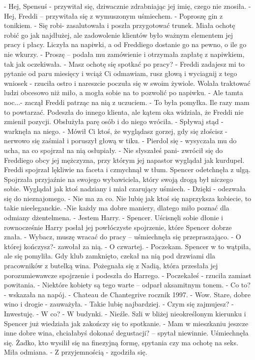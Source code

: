 \documentclass[12pt,a4paper]{book}
\begin{document}
- Hej, Spensuś - przywitał się, dziwacznie zdrabniając jej imię, czego nie znosiła. 
- Hej, Freddi – przywitała się z wymuszonym uśmiechem. 
- Poproszę gin z tonikiem.
- Się robi- zasalutowała i poszła przygotować trunek. 
Miała ochotę robić go jak najdłużej, ale zadowolenie klientów było ważnym elementem jej pracy i płacy. Liczyła na napiwki, a od Freddiego dostanie go na pewno, o ile go nie wkurzy. 
- Proszę – podała mu zamówienie i otrzymała zapłatę z napiwkiem, tak jak oczekiwała. 
- Masz ochotę się spotkać po pracy?
- Freddi zadajesz mi to pytanie od paru miesięcy i wciąż Ci odmawiam, rusz głową i wyciagnij z tego wniosek - rzuciła ostro i nareszcie poczuła się w swoim żywiole. 
Wolała traktować ludzi obcesowo niż miło, a mogła sobie na to pozwolić po napiwku.
- Ale tamta noc...- zaczął Freddi patrząc na nią z uczuciem. 
- To była pomyłka. Ile razy mam to powtarzać. 
Podeszła do innego klienta, ale kątem oka widziala, że Freddi nie zmienił pozycji. Obsłużyła parę osób i do niego wróciła.
- Spływaj stąd - warknęła na niego. 
- Mówił Ci ktoś, że wyglądasz gorzej, gdy się złościsz - nerwowo się zaśmiał i poruszył głową w tiku. 
- Pierdol się - wysyczała mu do ucha, na co spojrzał na nią osłupiały.
- Nie słyszałeś pani- zwrócił się do Freddiego obcy jej mężczyzna, przy którym jej napastor wyglądał jak kurdupel.
Freddi spojrzał lękliwie na faceta i czmychnął w tłum. 
Spencer odetchnęła z ulgą. Spojrzała przyjaźnie na swojego wybawiciela, który swoją drogą był niczego sobie. Wyglądał jak ktoś nadziany i miał czarujący uśmiech. 
- Dzięki - odezwała się do nieznajomego. 
- Nie ma za co. Nie lubię jak ktoś się naprzyksza kobiecie, to takie nieeleganckie. 
-Nie każdy ma dobre maniery, dlatego miło poznać dla odmiany dżentelmena. 
- Jestem Harry.
- Spencer.
Uścisnęli sobie dłonie i rownocześnie Harry posłał jej powłóczyste spojrzenie, które Spencer dobrze znała. 
- Wybacz, muszę wracać do pracy – uśmiechnęła się przepraszająco. 
- O której kończysz?- zawołał za nią.
- O czwartej. 
- Poczekam. 
Spencer w to wątpiła, ale się pomyliła. Gdy klub zamknięto, czekał na nią pod drzwiami dla pracowników z butelką wina. 
Pożegnała się z Nadią, która przesłała jej porozumiewawcze spojrzenie i podeszła do Harrego.
- Poczekałeś - rzuciła zamiast powitania.
- Niektóre kobiety są tego warte – odparł aksamitnym tonem.
- Co to?- wskazała na napój.
- Chateau de Chantegrive rocznik 1997.
- Wow. Stare, dobre wino i drogie - zauważyła.
- Takie lubię najbardziej. 
- Czym się zajmujesz?
- Inwestuję. 
- W co?
- W budynki. 
- Nieźle. 
Szli w bliżej nieokreślonym kierunku i Spencer już wiedziała jak zakończy się to spotkanie. 
- Mam w mieszkaniu jeszcze inne dobre wina, chciałabyś dokonać degustacji? – spytał niewinnie.
Uśmiechnęła się. Żadko, kto wysilił się na finezyjną formę, spytania czy ma ochotę na seks. Miła odmiana.
- Z przyjemnością - zgodziła się. 
\end{document}
